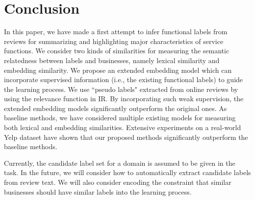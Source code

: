 \section{Conclusion}

In this paper, we have made a first attempt to infer functional labels from reviews for summarizing and highlighting major characteristics of service functions.  We consider two kinds of similarities for measuring the semantic relatedness between labels and businesses, namely lexical similarity and embedding similarity. We propose an extended embedding model which can incorporate supervised information (i.e., the existing functional labels) to guide the learning process. We use ``pseudo labels" extracted from online reviews by using the relevance function in IR. By incorporating such weak supervision, the extended embedding models significantly outperform the original ones.  As baseline methods, we have considered multiple existing models for measuring both lexical and embedding similarities. Extensive experiments on a real-world Yelp dataset have shown that our proposed methods significantly outperform the baseline methods. 


Currently, the candidate label set for a domain is assumed to be given in the task.  In the future, we will consider how to automatically extract candidate labels from review text.   We will also consider encoding the constraint that similar businesses should have similar labels into the learning process.